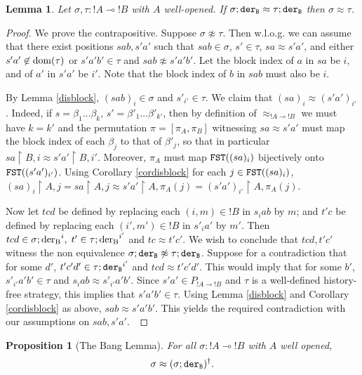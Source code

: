 \documentclass[11pt]{article}
\newtheorem{lemma}[theorem]{Lemma}
\newtheorem{proposition}[theorem]{Proposition}
\newcommand{\Rest}{{\upharpoonright}}
\newcommand{\linimpl}{\mbox{$\multimap$}}
\begin{document}
\begin{lemma}\label{lemma2}
Let $\sigma,\tau: !A\linimpl !B$ with $A$ well-opened. If
$\sigma;\tt{der}_B \approx \tau;\tt{der}_B$ then $\sigma\approx\tau$.
\end{lemma}
\begin{proof} We prove the contrapositive. Suppose
$\sigma\not\approx\tau$. Then w.l.o.g. we can assume that there
exist positions $sab, s'a'$ such that $sab\in \sigma$,
$s'\in\tau$, $sa\approx s'a'$, and either
$s'a'\not\in\rm{dom}(\tau)$ or $ s'a'b'\in\tau$ and
$sab\not\approx s'a'b'$. Let the block index of $a$ in $sa$ be
$i$, and of $a'$ in $s'a'$ be $i'$. Note that the block index of
$b$ in $sab$ must also be $i$.

By Lemma \ref{disblock}, $(sab)_i\in\sigma$ and $s'_{i'}\in\tau$. We
claim that $(sa)_i\approx(s'a')_{i'}$. Indeed, if $s=\beta_1\dots
\beta_k$, $s'=\beta'_1\dots\beta'_{k'}$, then by definition of
$\approx_{!A\linimpl !B}$ we must have $k=k'$ and the permutation
$\pi=[\pi_A,\pi_B]$ witnessing $sa\approx s'a'$ must map the block
index of each $\beta_j$ to that of $\beta'_j$, so that in particular
$sa\Rest B{,i}\approx s'a'\Rest B{,i'}$. Moreover, $\pi_A$ must map
${\tt FST}((sa)_i)$ bijectively onto ${\tt FST}((s'a')_{i'})$. Using
Corollary \ref{cordisblock} for each $j\in {\tt FST}((sa)_i)$, $(sa)_i \Rest
  A{,j}= sa\Rest A{,j}\approx s'a'\Rest A {,\pi_A(j)}
  =(s'a')_{i'}\Rest A {,\pi_A(j)}$.

Now let $tcd$ be defined by replacing each $(i,m)\in !B$ in $s_i
ab$ by $m$; and $t'c$ be defined by replacing each $(i',m')\in !B$
in $s'_ia'$ by $m'$. Then $tcd\in\sigma;{\rm{der}_B}^i,\;
t'\in\tau;{\rm{der}_B}^{i'}$ and $tc\approx t'c'$. We wish to
conclude that $tcd,t'c'$ witness the non equivalence
$\sigma;\tt{der}_B\not\approx \tau;\tt{der}_B$. Suppose for a
contradiction that for some $d'$,
$t'c'd'\in\tau;{\tt{der}_B}^{i'}$ and $tcd\approx t'c'd'$. This
would imply that for some $b'$, $s'_{i' }a'b'\in\tau$ and
$s_iab\approx s'_{i'}a'b'$. Since $s'a'\in P_{!A\linimpl !B}$ and
$\tau$ is a well-defined history-free strategy, this implies that
$s'a'b'\in\tau$. Using Lemma \ref{disblock} and Corollary
\ref{cordisblock} as above, $sab\approx s'a'b'$. This yields the
required contradiction with our assumptions on $sab,s'a'.\;\;$
\end{proof}

\begin{proposition}
[The Bang Lemma]

For all $\sigma:{!A\linimpl !B}$ with $A$ well opened,
$$\sigma\approx (\sigma;\tt{der}_B)^{\dag}. $$
\end{proposition}
\end{document}
